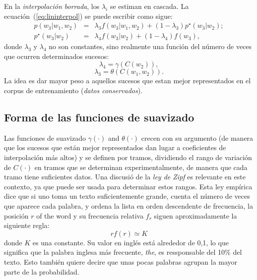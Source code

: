 \documentclass[12pt,a4paper]{article} \usepackage[spanish]{babel}
\begin{document}
En la  \emph{interpolación borrada}, los
\begin{math}
  \lambda_i
\end{math} se estiman en cascada. La ecuación~(\ref{eq:lininterpol}) se puede escribir como sigue:
\begin{equation}
  \label{eq:delinter}
  \begin{array}{rcl}
  p(w_3|w_1,w_2)&=&\lambda_3 f(w_3|w_1,w_2) + (1-\lambda_3)p^\star(w_3|w_2);\\
  p^\star(w_3|w_2)&=&\lambda_4f(w_3|w_2) + (1-\lambda_4)f(w_3),
  \end{array}
\end{equation}
donde
\begin{math}
  \lambda_3
\end{math}
y
\begin{math}
  \lambda_4
\end{math}
no son constantes, sino realmente una función del número de veces que ocurren determinados sucesos:
\begin{equation}
  \lambda_4=\gamma(C(w_2)),
\end{equation}
\begin{equation}
  \lambda_3=\theta(C(w_1,w_2)).
\end{equation}
La idea es dar mayor peso a aquellos sucesos que estan mejor representados en el corpus de entrenamiento (\emph{datos conservados}).

\subsection{Forma de las funciones de suavizado}

Las funciones de suavizado
\begin{math}
  \gamma(\cdot) 
\end{math}
and 
\begin{math}
  \theta(\cdot)
\end{math}
crecen con su argumento (de manera que los sucesos que están mejor representados dan lugar a coeficientes de interpolación más altos) y se definen por tramos, dividiendo el rango de variación de 
\begin{math}
  C(\cdot)
\end{math}
en tramos que se determinan experimentalmente, de manera que cada tramo tiene suficientes datos. Una discusió de la 
 \emph{ley de Zipf} es relevante en este contexto, ya que puede ser usada para determinar estos rangos. Esta ley empírica dice que si uno toma un texto suficientemente grande, cuenta el número de veces que aparece cada palabra, y ordena la lista en orden descendente de frecuencia, la posición \(r\) of the word y su frecuencia relativa \(f_r\) siguen aproximadamente la siguiente regla: 
\begin{equation}
  \label{eq:zipf}
  r f(r) \simeq K
\end{equation}
donde  \(K\) es una constante. Su valor en inglés está alrededor de 0,1, lo que significa que la palabra inglesa más frecuente, \emph{the}, es ressponsable del  10\% del texto. Esto también quiere decire que unas pocas palabras agrupan la mayor parte de la probabilidad. 
\end{document}
